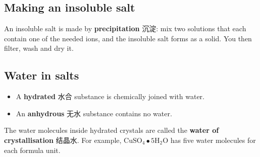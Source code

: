 \documentclass[11pt]{article}
\begin{document}
\subsection*{Making an insoluble salt}

An insoluble salt is made by \textbf{precipitation} 沉淀: mix two solutions that each contain one of the needed ions, and the insoluble salt forms as a solid. You then filter, wash and dry it.

\subsection*{Water in salts}

\begin{itemize}
\item A \textbf{hydrated} 水合 substance is chemically joined with water.

\item An \textbf{anhydrous} 无水 substance contains no water.

\end{itemize}

The water molecules inside hydrated crystals are called the \textbf{water of crystallisation} 结晶水. For example, $\text{CuSO}_4 \bullet 5\text{H}_2\text{O}$ has five water molecules for each formula unit.
\end{document}
